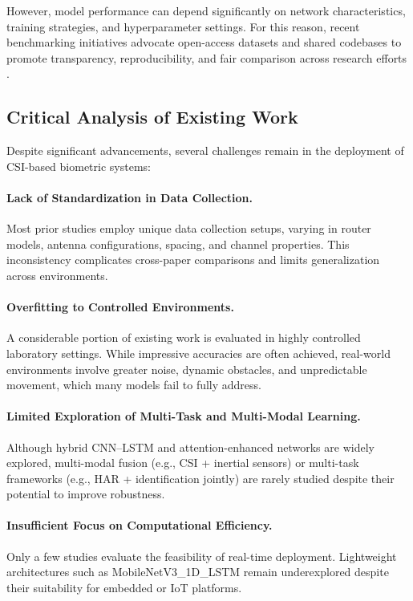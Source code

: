 However, model performance can depend significantly on network characteristics, training strategies, and hyperparameter settings. For this reason, recent benchmarking initiatives advocate open-access datasets and shared codebases to promote transparency, reproducibility, and fair comparison across research efforts \parencite{csibench2025,yang2023sensefi}.

\subsection{Critical Analysis of Existing Work}

Despite significant advancements, several challenges remain in the deployment of CSI-based biometric systems:

\paragraph{Lack of Standardization in Data Collection.}
Most prior studies employ unique data collection setups, varying in router models, antenna configurations, spacing, and channel properties. This inconsistency complicates cross-paper comparisons and limits generalization across environments.

\paragraph{Overfitting to Controlled Environments.}
A considerable portion of existing work is evaluated in highly controlled laboratory settings. While impressive accuracies are often achieved, real-world environments involve greater noise, dynamic obstacles, and unpredictable movement, which many models fail to fully address.

\paragraph{Limited Exploration of Multi-Task and Multi-Modal Learning.}
Although hybrid CNN–LSTM and attention-enhanced networks are widely explored, multi-modal fusion (e.g., CSI + inertial sensors) or multi-task frameworks (e.g., HAR + identification jointly) are rarely studied despite their potential to improve robustness.

\paragraph{Insufficient Focus on Computational Efficiency.}
Only a few studies evaluate the feasibility of real-time deployment. Lightweight architectures such as MobileNetV3\_1D\_LSTM remain underexplored despite their suitability for embedded or IoT platforms.

